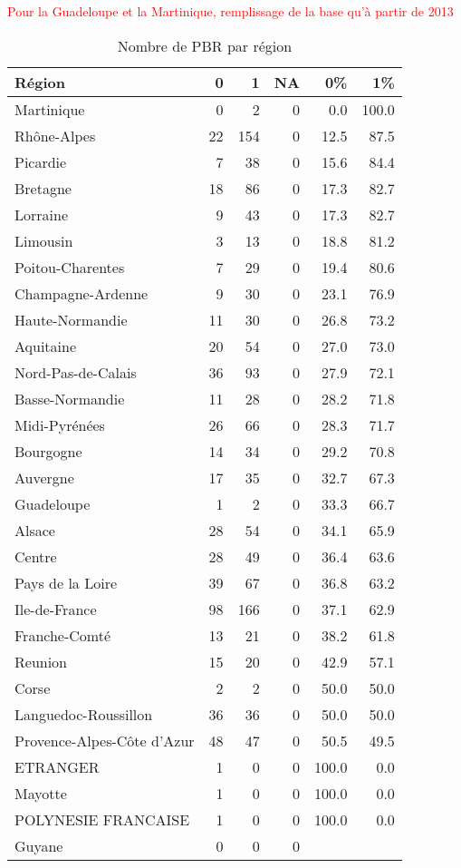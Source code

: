 \documentclass[11pt,a4paper]{article}\usepackage[]{graphicx}\usepackage[]{color}
\begin{document}
\textcolor{red}{Pour la Guadeloupe et la Martinique, remplissage de la base qu'à partir de 2013}

\begin{table}[H]
\centering
\begingroup\small
\begin{tabular}{lrrrrr}
  \hline
Région & 0 & 1 & NA & 0\% & 1\% \\ 
  \hline
Martinique & 0 & 2 & 0 & 0.0 & 100.0 \\ 
  Rhône-Alpes & 22 & 154 & 0 & 12.5 & 87.5 \\ 
  Picardie & 7 & 38 & 0 & 15.6 & 84.4 \\ 
  Bretagne & 18 & 86 & 0 & 17.3 & 82.7 \\ 
  Lorraine & 9 & 43 & 0 & 17.3 & 82.7 \\ 
  Limousin & 3 & 13 & 0 & 18.8 & 81.2 \\ 
  Poitou-Charentes & 7 & 29 & 0 & 19.4 & 80.6 \\ 
  Champagne-Ardenne & 9 & 30 & 0 & 23.1 & 76.9 \\ 
  Haute-Normandie & 11 & 30 & 0 & 26.8 & 73.2 \\ 
  Aquitaine & 20 & 54 & 0 & 27.0 & 73.0 \\ 
  Nord-Pas-de-Calais & 36 & 93 & 0 & 27.9 & 72.1 \\ 
  Basse-Normandie & 11 & 28 & 0 & 28.2 & 71.8 \\ 
  Midi-Pyrénées & 26 & 66 & 0 & 28.3 & 71.7 \\ 
  Bourgogne & 14 & 34 & 0 & 29.2 & 70.8 \\ 
  Auvergne & 17 & 35 & 0 & 32.7 & 67.3 \\ 
  Guadeloupe & 1 & 2 & 0 & 33.3 & 66.7 \\ 
  Alsace & 28 & 54 & 0 & 34.1 & 65.9 \\ 
  Centre & 28 & 49 & 0 & 36.4 & 63.6 \\ 
  Pays de la Loire & 39 & 67 & 0 & 36.8 & 63.2 \\ 
  Ile-de-France & 98 & 166 & 0 & 37.1 & 62.9 \\ 
  Franche-Comté & 13 & 21 & 0 & 38.2 & 61.8 \\ 
  Reunion & 15 & 20 & 0 & 42.9 & 57.1 \\ 
  Corse & 2 & 2 & 0 & 50.0 & 50.0 \\ 
  Languedoc-Roussillon & 36 & 36 & 0 & 50.0 & 50.0 \\ 
  Provence-Alpes-Côte d'Azur & 48 & 47 & 0 & 50.5 & 49.5 \\ 
  ETRANGER & 1 & 0 & 0 & 100.0 & 0.0 \\ 
  Mayotte & 1 & 0 & 0 & 100.0 & 0.0 \\ 
  POLYNESIE FRANCAISE & 1 & 0 & 0 & 100.0 & 0.0 \\ 
  Guyane & 0 & 0 & 0 &  &  \\ 
   \hline
\end{tabular}
\endgroup
\caption{Nombre de PBR par région} 
\end{table}
\end{document}
